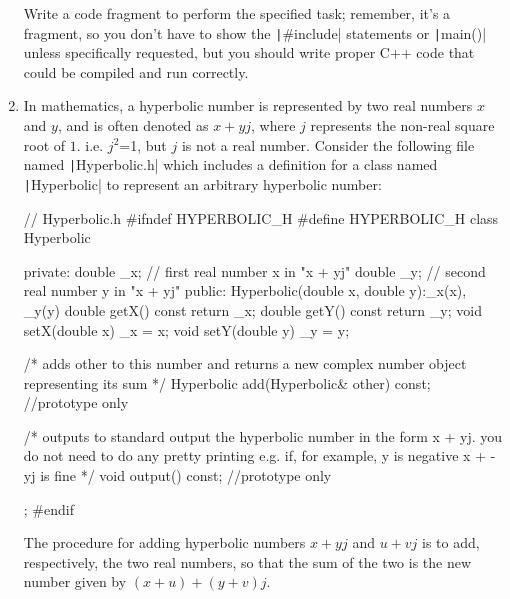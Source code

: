 \documentclass[12pt]{article}
\newenvironment{codeblock}{\VerbatimEnvironment\begin{c11*}{}}{\end{c11*}} %
\begin{document}
\begin{enumerate}
Write a code fragment to perform the specified task; remember, it's a fragment, so you don't have to show the \texttt|#include| statements or \texttt|main()| unless specifically requested, but you should write proper C++ code that could be compiled and run correctly.

\item In mathematics, a hyperbolic number is represented by two real numbers $x$ and $y$, and is often denoted as $x + yj$, where $j$ represents the non-real square root of $1$. i.e. $j^2$=1, but $j$ is not a real number. Consider the following file named \texttt|Hyperbolic.h| which includes a definition for a class named \texttt|Hyperbolic| to represent an arbitrary hyperbolic number:\begin{codeblock}
// Hyperbolic.h
#ifndef HYPERBOLIC_H
#define HYPERBOLIC_H
class Hyperbolic {
private: 
	double _x; // first real number x in "x + yj"
	double _y; // second real number y in "x + yj"
public:     
	Hyperbolic(double x, double y):_x(x), _y(y) {}
	double getX() const { return _x; }
	double getY() const { return _y; }
	void setX(double x) { _x = x; }
	void setY(double y) { _y = y; }	   
	
	/* adds other to this number and returns a new complex number     
	object representing its sum */
	Hyperbolic add(Hyperbolic& other) const;  	//prototype only
	
	/* outputs to standard output the hyperbolic number in the form 
	x + yj. you do not need to do any pretty printing e.g. if, 
	for example, y is negative x + -yj is fine */
	void output() const;                		//prototype only
};  
#endif
\end{codeblock}
The procedure for adding hyperbolic numbers $x + yj$ and $u + vj$ is to add, respectively, the two real numbers, so that the sum of the two is the new number given by $(x + u) + (y + v)j$.


\end{enumerate}
\end{document}
